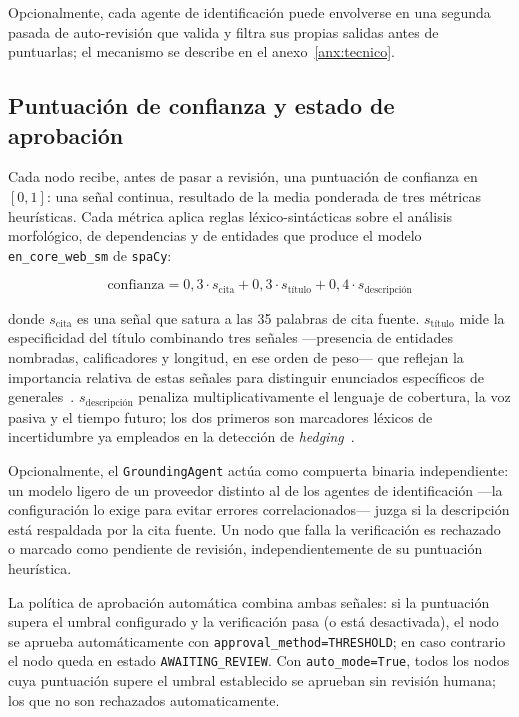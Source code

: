 Opcionalmente, cada agente de identificación puede envolverse en una segunda pasada de
auto-revisión que valida y filtra sus propias salidas antes de puntuarlas; el mecanismo se
describe en el anexo~\ref{anx:tecnico}.

\subsection{Puntuación de confianza y estado de aprobación}
\label{sec:confidence-scoring}

Cada nodo recibe, antes de pasar a revisión, una puntuación de confianza en $[0,1]$: una señal
continua, resultado de la media ponderada de tres métricas heurísticas. Cada métrica aplica
reglas léxico-sintácticas sobre el análisis morfológico, de dependencias y de entidades que
produce el modelo \texttt{en\_core\_web\_sm} de \texttt{spaCy}:

\begin{equation}
  \text{confianza} = 0{,}3 \cdot s_{\text{cita}} + 0{,}3 \cdot s_{\text{título}} + 0{,}4 \cdot s_{\text{descripción}}
\end{equation}

donde $s_{\text{cita}}$ es una señal que satura a las 35 palabras de cita fuente. $s_{\text{título}}$ mide
la especificidad del título combinando tres señales —presencia de entidades nombradas, calificadores y
longitud, en ese orden de peso— que reflejan la importancia relativa de estas señales para distinguir
enunciados específicos de generales~\cite{louis2011specificity}. $s_{\text{descripción}}$ penaliza
multiplicativamente el lenguaje de cobertura, la voz pasiva y el tiempo futuro; los dos primeros son
marcadores léxicos de incertidumbre ya empleados en la detección de \textit{hedging}~\cite{farkas2010conll}.

Opcionalmente, el \texttt{GroundingAgent} actúa como compuerta binaria independiente: un modelo
ligero de un proveedor distinto al de los agentes de identificación —la configuración lo exige
para evitar errores correlacionados— juzga si la descripción está respaldada por la cita fuente.
Un nodo que falla la verificación es rechazado o marcado como pendiente de revisión,
independientemente de su puntuación heurística.

La política de aprobación automática combina ambas señales: si la puntuación supera el umbral
configurado y la verificación pasa (o está desactivada), el nodo se aprueba automáticamente con
\texttt{approval\_method=THRESHOLD}; en caso contrario el nodo queda en estado \texttt{AWAITING\_REVIEW}.
Con \texttt{auto\_mode=True}, todos los nodos cuya puntuación supere el umbral establecido se
aprueban sin revisión humana; los que no son rechazados automaticamente.

